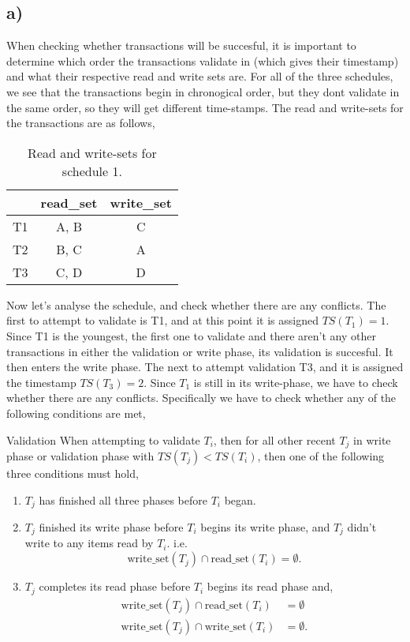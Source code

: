 \documentclass[working, oneside]{../../Preambles/tuftebook}
\begin{document}
\subsection*{a)}
When checking whether transactions will be succesful, it is important to determine which order the transactions validate in (which gives their timestamp) and what their respective read and write sets are. For all of the three schedules, we see that the transactions begin in chronogical order, but they dont validate in the same order, so they will get different time-stamps.
The read and write-sets for the transactions are as follows,
 \begin{table}[htpb]
    \centering
    \begin{tabular}{c|c|c}
        & read\_set& write\_set \\ \hline
        T1 & A, B & C \\ \hline
        T2 & B, C & A \\ \hline
        T3 & C, D & D
    \end{tabular}
    \caption*{Read and write-sets for schedule 1.}
\end{table}
Now let's analyse the schedule, and check whether there are any conflicts. The first to attempt to validate is T1, and at this point it is assigned $TS(T_1) = 1$. Since T1 is the youngest, the first one to validate and there aren't any other transactions in either the validation or write phase, its validation is succesful. It then enters the write phase. The next to attempt validation T3, and it is assigned the timestamp $TS(T_3) = 2$. Since $T_1$ is still in its write-phase, we have to check whether there are any conflicts. Specifically we have to check whether any of the following conditions are met,
\begin{SimpleBox}{Validation}
    When attempting to validate $T_i$, then for all other recent $T_j$ in write phase or validation phase with $TS(T_j) < TS(T_i)$, then one of the following three conditions must hold,
    \begin{enumerate}
        \item $T_j$ has finished all three phases before $T_i$ began.
        \item  $T_j$  finished its write phase before $T_i$ begins its write phase, and $T_j$ didn't write to any items read by  $T_i$. i.e.
             \[
            \text{write\_set}(T_j) \cap \text{read\_set}(T_i) = \emptyset
            .\] 
        \item $T_j$ completes its read phase before  $T_i$ begins its read phase and,
             \begin{align*}
                 \text{write\_set}(T_j) \cap \text{read\_set}(T_i) &= \emptyset\\
                 \text{write\_set}(T_j) \cap \text{write\_set}(T_i) &= \emptyset
            .\end{align*}
    \end{enumerate}
\end{SimpleBox}
\end{document}
